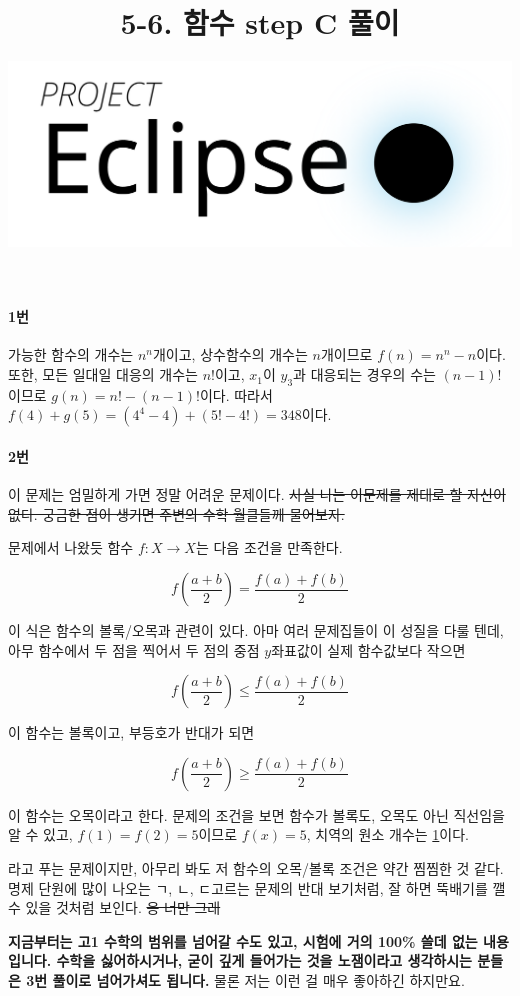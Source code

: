 \documentclass{article}
\title{5-6. 함수 step C 풀이}
\author{
    \includegraphics[scale=0.25]{logo}
}
\date{}
\begin{document}
\maketitle

\paragraph{1번}
가능한 함수의 개수는 $n^n$개이고, 상수함수의 개수는 $n$개이므로 $f(n) = n^n - n$이다. 또한, 모든 일대일 대응의 개수는 $n!$이고, $x_1$이 $y_3$과 대응되는 경우의 수는 $(n - 1)!$이므로 $g(n) = n! - (n - 1)!$이다. 따라서 $f(4) + g(5) = (4^4 - 4) + (5! - 4!) = 348$이다.

\paragraph{2번}
이 문제는 엄밀하게 가면 정말 어려운 문제이다. \sout{사실 나는 이문제를 제대로 할 자신이 없다. 궁금한 점이 생기면 주변의 수학 월클들께 물어보자.} \newline

문제에서 나왔듯 함수 $f: X \longrightarrow X$는 다음 조건을 만족한다.

\[
    f(\frac{a + b}{2}) = \frac{f(a) + f(b)}{2}
\]

이 식은 함수의 볼록/오목과 관련이 있다. 아마 여러 문제집들이 이 성질을 다룰 텐데, 아무 함수에서 두 점을 찍어서 두 점의 중점 $y$좌표값이 실제 함수값보다 작으면

\[
    f(\frac{a + b}{2}) \le \frac{f(a) + f(b)}{2}
\]

이 함수는 볼록이고, 부등호가 반대가 되면

\[
    f(\frac{a + b}{2}) \ge \frac{f(a) + f(b)}{2}
\]

이 함수는 오목이라고 한다. 문제의 조건을 보면 함수가 볼록도, 오목도 아닌 직선임을 알 수 있고, $f(1) = f(2) = 5$이므로 $f(x) = 5$, 치역의 원소 개수는 \underline{1}이다. \newline

라고 푸는 문제이지만, 아무리 봐도 저 함수의 오목/볼록 조건은 약간 찜찜한 것 같다. 명제 단원에 많이 나오는 ㄱ, ㄴ, ㄷ고르는 문제의 반대 보기처럼, 잘 하면 뚝배기를 깰 수 있을 것처럼 보인다. \sout{응 너만 그래} \newline

\textbf{지금부터는 고1 수학의 범위를 넘어갈 수도 있고, 시험에 거의 100\% 쓸데 없는 내용입니다. 수학을 싫어하시거나, 굳이 깊게 들어가는 것을 노잼이라고 생각하시는 분들은 3번 풀이로 넘어가셔도 됩니다.} 물론 저는 이런 걸 매우 좋아하긴 하지만요. \newline
\end{document}
